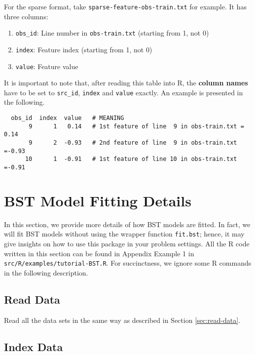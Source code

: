 \documentclass[10pt]{article}
\begin{document}
For the sparse format, take {\tt sparse-feature-obs-train.txt} for example.  It has three columns:
\begin{enumerate}
\item {\tt obs\_id}: Line number in {\tt obs-train.txt} (starting from 1, not 0)
\item {\tt index}: Feature index (starting from 1, not 0)
\item {\tt value}: Feature value
\end{enumerate}
It is important to note that, after reading this table into R, the {\bf column names} have to be set to {\tt src\_id}, {\tt index} and {\tt value} exactly.  An example is presented in the following.
{\small\begin{verbatim}
  obs_id  index  value   # MEANING
       9      1   0.14   # 1st feature of line  9 in obs-train.txt = 0.14
       9      2  -0.93   # 2nd feature of line  9 in obs-train.txt =-0.93
      10      1  -0.91   # 1st feature of line 10 in obs-train.txt =-0.91
\end{verbatim}}






\appendix

\section{BST Model Fitting Details}
\label{sec:fitting}

In this section, we provide more details of how BST models are fitted.  In fact, we will fit BST models without using the wrapper function {\tt fit.bst}; hence, it may give insights on how to use this package in your problem settings.  All the R code written in this section can be 
found in Appendix Example 1 in {\tt src/R/examples/tutorial-BST.R}.  For succinctness, we ignore some R commands in the following description.

\subsection{Read Data}

Read all the data sets in the same way as described in Section \ref{sec:read-data}.

\subsection{Index Data}
\label{sec:index-data}
\end{document}
